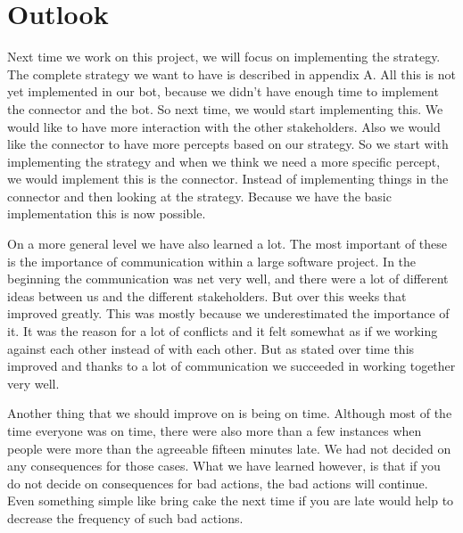 \section{Outlook}
Next time we work on this project, we will focus on implementing the strategy. The complete strategy we want to have is described in appendix A. All this is not yet implemented in our bot, because we didn't have enough time to implement the connector and the bot. So next time, we would start implementing this. We would like to have more interaction with the other stakeholders. Also we would like the connector to have more percepts based on our strategy. So we start with implementing the strategy and when we think we need a more specific percept, we would implement this is the connector. Instead of implementing things in the connector and then looking at the strategy. Because we have the basic implementation this is now possible.

On a more general level we have also learned a lot. The most important of these is the importance of communication within a large software project. In the beginning the communication was net very well, and there were a lot of different ideas between us and the different stakeholders. But over this weeks that improved greatly. This was mostly because we underestimated the importance of it. It was the reason for a lot of conflicts and it felt somewhat as if we working against each other instead of with each other. But as stated over time this improved and thanks to a lot of communication we succeeded in working together very well.

Another thing that we should improve on is being on time. Although most of the time everyone was on time, there were also more than a few instances when people were more than the agreeable fifteen minutes late. We had not decided on any consequences for those cases. What we have learned however, is that if you do not decide on consequences for bad actions, the bad actions will continue. Even something simple like bring cake the next time if you are late would help to decrease the frequency of such bad actions.